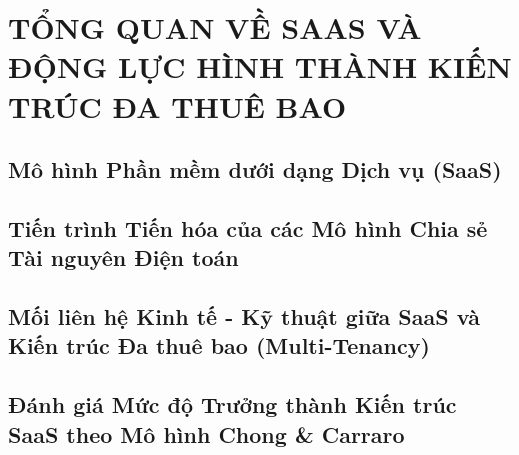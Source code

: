 \par{}
\section{TỔNG QUAN VỀ SAAS VÀ ĐỘNG LỰC HÌNH THÀNH KIẾN TRÚC ĐA THUÊ BAO}
\label{outline:1:saas:1}

\par{}
\subsection{Mô hình Phần mềm dưới dạng Dịch vụ (SaaS)}
\label{outline:1:saas:2}

\par{}
\subsection{Tiến trình Tiến hóa của các Mô hình Chia sẻ Tài nguyên Điện toán}
\label{outline:1:saas:3}

\par{}
\subsection{Mối liên hệ Kinh tế - Kỹ thuật giữa SaaS và Kiến trúc Đa thuê bao (Multi-Tenancy)}
\label{outline:1:saas:4}

\par{}
\subsection{Đánh giá Mức độ Trưởng thành Kiến trúc SaaS theo Mô hình Chong \& Carraro}
\label{outline:1:saas:5}
